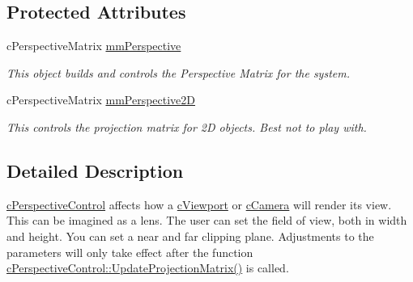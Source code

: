 \subsection*{Protected Attributes}
\begin{DoxyCompactItemize}
\item 
\hypertarget{classc_perspective_control_a6386c5032f9471f652f1444070a09e03}{
cPerspectiveMatrix \hyperlink{classc_perspective_control_a6386c5032f9471f652f1444070a09e03}{mmPerspective}}
\label{classc_perspective_control_a6386c5032f9471f652f1444070a09e03}

\begin{DoxyCompactList}\small\item\em This object builds and controls the Perspective Matrix for the system. \end{DoxyCompactList}\item 
\hypertarget{classc_perspective_control_abdd9b35aa9410e08fe3608b42a7e011c}{
cPerspectiveMatrix \hyperlink{classc_perspective_control_abdd9b35aa9410e08fe3608b42a7e011c}{mmPerspective2D}}
\label{classc_perspective_control_abdd9b35aa9410e08fe3608b42a7e011c}

\begin{DoxyCompactList}\small\item\em This controls the projection matrix for 2D objects. Best not to play with. \end{DoxyCompactList}\end{DoxyCompactItemize}


\subsection{Detailed Description}
\hyperlink{classc_perspective_control}{cPerspectiveControl} affects how a \hyperlink{classc_viewport}{cViewport} or \hyperlink{classc_camera}{cCamera} will render its view. This can be imagined as a lens. The user can set the field of view, both in width and height. You can set a near and far clipping plane. Adjustments to the parameters will only take effect after the function \hyperlink{classc_perspective_control_a21f71c817289e0f250dbe9fa83f269bd}{cPerspectiveControl::UpdateProjectionMatrix()} is called. 